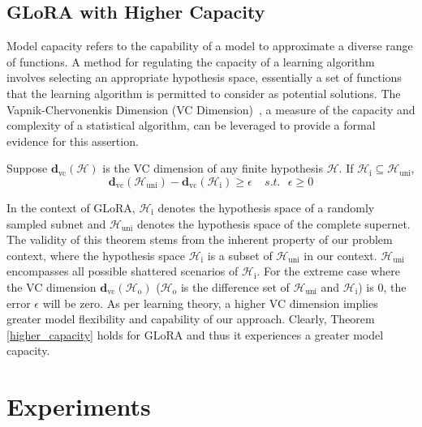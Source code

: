 \subsection{GLoRA with Higher Capacity}

Model capacity refers to the capability of a model to approximate a diverse range of functions. A method for regulating the capacity of a learning algorithm involves selecting an appropriate hypothesis space, essentially a set of functions that the learning algorithm is permitted to consider as potential solutions. The Vapnik-Chervonenkis Dimension (VC Dimension)~\citep{vapnik2015uniform}, a measure of the capacity and complexity of a statistical algorithm, can be leveraged to provide a formal evidence for this assertion.

\begin{theorem} 
Suppose \(\mathbf d_\mathrm{vc}(\mathcal{H})\) is the VC dimension of any finite hypothesis \(\mathcal{H}\). If \(\mathcal{H}_\mathrm{i} \subseteq \mathcal{H}_\mathrm{uni}\),
\[ \mathbf d_\mathrm{vc}(\mathcal{H}_\mathrm{uni}) 	- \mathbf d_\mathrm{vc}(\mathcal{H}_\mathrm{i}) \geq \epsilon \ \ \ \ \  s.t. \ \ \ \epsilon \geq 0  \]
\label{higher_capacity}
\end{theorem}

In the context of GLoRA, $\mathcal{H}_\mathrm{i}$ denotes the hypothesis space of a randomly sampled subnet and $\mathcal{H}_\mathrm{uni}$ denotes the hypothesis space of the complete supernet. The validity of this theorem stems from the inherent property of our problem context, where the hypothesis space $\mathcal{H}_\mathrm{i}$ is a subset of $\mathcal{H}_\mathrm{uni}$ in our context. $\mathcal{H}_\mathrm{uni}$ encompasses all possible shattered scenarios of $\mathcal{H}_\mathrm{i}$. For the extreme case where the VC dimension $\mathbf d_\mathrm{vc}(\mathcal{H}_\mathrm{o})$ ($\mathcal{H}_\mathrm{o}$ is the difference set of $\mathcal{H}_\mathrm{uni}$ and $\mathcal{H}_\mathrm{i}$) is 0, the error $\epsilon$ will be zero. As per learning theory, a higher VC dimension implies greater model flexibility and capability of our approach. Clearly, Theorem \ref{higher_capacity} holds for GLoRA and thus it experiences a greater model capacity.

\section{Experiments} \label{exps}

